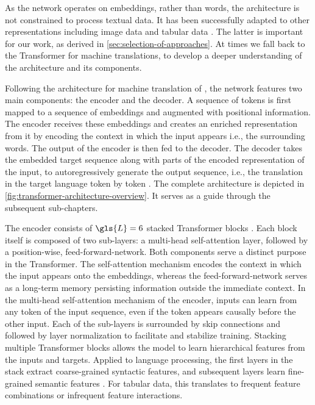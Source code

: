As the network operates on \glspl{embedding}, rather than words, the architecture is not constrained to process textual data. It has been successfully adapted to other representations including image data \autocites[][2--5]{parmarImageTransformer2018}[][3]{dosovitskiyImageWorth16x162021} and tabular data \autocite[cp.][18932]{gorishniyRevisitingDeepLearning2021}. The latter is important for our work, as derived in \cref{sec:selection-of-approaches}. At times we fall back to the Transformer for machine translations, to develop a deeper understanding of the architecture and its components.

Following the architecture for machine translation of \textcite[][3]{sutskeverSequenceSequenceLearning2014}, the network features two main components: the encoder and the decoder. A sequence of \glspl{token} is first mapped to a sequence of \glspl{embedding} and augmented with positional information. The encoder receives these \glspl{embedding} and creates an enriched representation from it by encoding the context in which the input appears i.e., the surrounding words. The output of the encoder is then fed to the decoder. The decoder takes the embedded target sequence along with parts of the encoded representation of the input, to autoregressively generate the output sequence, i.e., the translation in the target language \gls{token} by \gls{token} \autocite[][3]{vaswaniAttentionAllYou2017}. The complete architecture is depicted in \cref{fig:transformer-architecture-overview}. It serves as a guide through the subsequent sub-chapters.

The encoder consists of $\gls{L}=6$ stacked Transformer blocks \autocite[][6]{vaswaniAttentionAllYou2017}. Each block itself is composed of two sub-layers: a multi-head self-attention layer, followed by a position-wise, \gls{feed-forward-network}. Both components serve a distinct purpose in the Transformer. The self-attention mechanism encodes the context in which the input appears onto the \glspl{embedding}, whereas the \gls{feed-forward-network} serves as a long-term memory persisting information outside the immediate context. In the multi-head self-attention mechanism of the encoder, inputs can learn from any \gls{token} of the input sequence, even if the \gls{token} appears causally before the other input. Each of the sub-layers is surrounded by skip connections \autocite[][2]{heDeepResidualLearning2015} and followed by layer normalization \autocite[][4]{baLayerNormalization2016} to facilitate and stabilize training. Stacking multiple Transformer blocks allows the model to learn hierarchical features from the inputs and targets. Applied to language processing, the first layers in the stack extract coarse-grained syntactic features, and subsequent layers learn fine-grained semantic features \autocites[][3651]{jawaharWhatDoesBERT2019}[][4596]{tenneyBERTRediscoversClassical2019}. For tabular data, this translates to frequent feature combinations or infrequent feature interactions.

